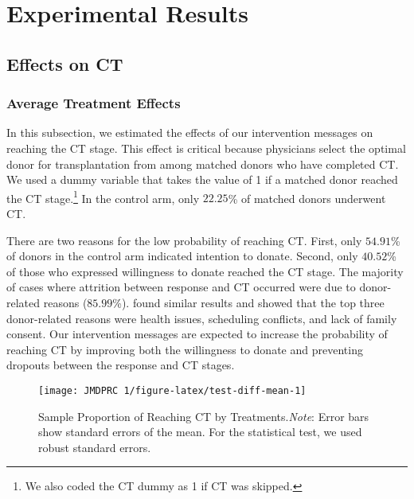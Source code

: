 \documentclass[12pt, a4paper]{article}
\begin{document}
\hypertarget{result}{%
\section{Experimental Results}\label{result}}

\hypertarget{main}{%
\subsection{Effects on CT}\label{main}}

\hypertarget{average-treatment-effects}{%
\subsubsection{Average Treatment Effects}\label{average-treatment-effects}}

In this subsection, we estimated the effects of our intervention messages on reaching the CT stage. This effect is critical because physicians select the optimal donor for transplantation from among matched donors who have completed CT. We used a dummy variable that takes the value of 1 if a matched donor reached the CT stage.\footnote{We also coded the CT dummy as 1 if CT was skipped.} In the control arm, only \(22.25\)\% of matched donors underwent CT.

There are two reasons for the low probability of reaching CT. First, only \(54.91\)\% of donors in the control arm indicated intention to donate. Second, only \(40.52\)\% of those who expressed willingness to donate reached the CT stage. The majority of cases where attrition between response and CT occurred were due to donor-related reasons (\(85.99\)\%). \citet{Hirakawa2018} found similar results and showed that the top three donor-related reasons were health issues, scheduling conflicts, and lack of family consent. Our intervention messages are expected to increase the probability of reaching CT by improving both the willingness to donate and preventing dropouts between the response and CT stages.

\begin{figure}[t]
\texttt{[image: JMDPRC~1/figure-latex/test-diff-mean-1]} \caption{Sample Proportion of Reaching CT by Treatments.\newline \emph{Note}: Error bars show standard errors of the mean. For the statistical test, we used robust standard errors.}\label{fig:test-diff-mean}
\end{figure}
\end{document}

